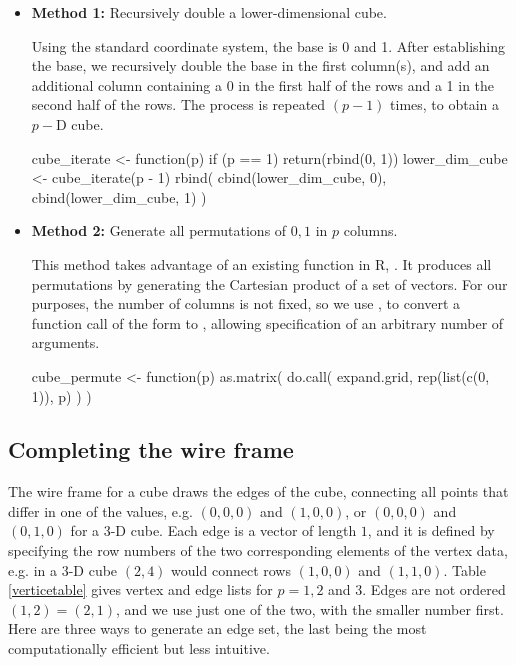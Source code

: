 \begin{itemize}

  \item {\bf Method 1:} Recursively double a lower-dimensional cube.

    Using the standard coordinate system, the base is 0 and 1. After
    establishing the base, we recursively double the base in the first
    column(s), and add an additional column containing a 0 in the
    first half of the rows and a 1 in the second half of the rows. The
    process is repeated $(p-1)$ times, to obtain a $p-$D cube.

\begin{example}
cube_iterate <- function(p) {
  if (p == 1) {
    return(rbind(0, 1))
  }
  lower_dim_cube <- cube_iterate(p - 1)
  rbind(
    cbind(lower_dim_cube, 0),
    cbind(lower_dim_cube, 1)
  )
}
\end{example}

  \item {\bf Method 2:} Generate all permutations of ${0, 1}$ in $p$ columns.

    This method takes advantage of an existing function in R,
    . It produces all permutations by generating the
    Cartesian product of a set of vectors. For our purposes, the
    number of columns is not fixed, so we use , to
    convert a function call of the form  to
    , allowing specification of an
    arbitrary number of arguments.

  \begin{example}
cube_permute <- function(p) {
  as.matrix(
    do.call(
      expand.grid,
      rep(list(c(0, 1)), p)
    )
  )
}
\end{example}
\end{itemize}

\subsection{Completing the wire frame}

The wire frame for a cube draws the edges of the cube,
connecting all points that differ in one of the values, e.g. $(0,0,0)$
and $(1,0,0)$, or $(0,0,0)$ and $(0,1,0)$ for a 3-D cube. Each edge is
a vector of length $1$, and it is defined by specifying the row
numbers of the two corresponding elements of the vertex data, e.g. in
a 3-D cube $(2,4)$ would connect rows $ (1,0,0)$ and $
(1,1,0)$. Table \ref{verticetable} gives vertex
and edge lists for $p=1, 2$ and $3$. Edges are not ordered $(1,2)=(2,1)$, and we use just
one of the two, with the smaller number first. Here are three ways to
generate an edge set, the last being the most computationally
efficient but less intuitive.


